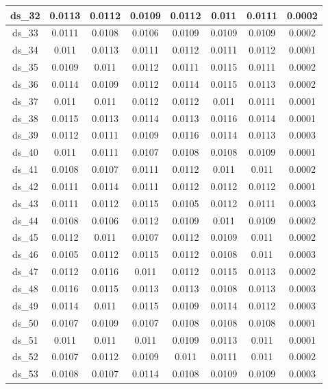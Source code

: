 \begin{longtable}{|c|c|c|c|c|c|c|c|}
ds\_32	& 0.0113	& 0.0112	& 0.0109	& 0.0112	& 0.011	& 0.0111	& 0.0002	\\ \hline
ds\_33	& 0.0111	& 0.0108	& 0.0106	& 0.0109	& 0.0109	& 0.0109	& 0.0002	\\ \hline
ds\_34	& 0.011	& 0.0113	& 0.0111	& 0.0112	& 0.0111	& 0.0112	& 0.0001	\\ \hline
ds\_35	& 0.0109	& 0.011	& 0.0112	& 0.0111	& 0.0115	& 0.0111	& 0.0002	\\ \hline
ds\_36	& 0.0114	& 0.0109	& 0.0112	& 0.0114	& 0.0115	& 0.0113	& 0.0002	\\ \hline
ds\_37	& 0.011	& 0.011	& 0.0112	& 0.0112	& 0.011	& 0.0111	& 0.0001	\\ \hline
ds\_38	& 0.0115	& 0.0113	& 0.0114	& 0.0113	& 0.0116	& 0.0114	& 0.0001	\\ \hline
ds\_39	& 0.0112	& 0.0111	& 0.0109	& 0.0116	& 0.0114	& 0.0113	& 0.0003	\\ \hline
ds\_40	& 0.011	& 0.0111	& 0.0107	& 0.0108	& 0.0108	& 0.0109	& 0.0001	\\ \hline
ds\_41	& 0.0108	& 0.0107	& 0.0111	& 0.0112	& 0.011	& 0.011	& 0.0002	\\ \hline
ds\_42	& 0.0111	& 0.0114	& 0.0111	& 0.0112	& 0.0112	& 0.0112	& 0.0001	\\ \hline
ds\_43	& 0.0111	& 0.0112	& 0.0115	& 0.0105	& 0.0112	& 0.0111	& 0.0003	\\ \hline
ds\_44	& 0.0108	& 0.0106	& 0.0112	& 0.0109	& 0.011	& 0.0109	& 0.0002	\\ \hline
ds\_45	& 0.0112	& 0.011	& 0.0107	& 0.0112	& 0.0109	& 0.011	& 0.0002	\\ \hline
ds\_46	& 0.0105	& 0.0112	& 0.0115	& 0.0112	& 0.0108	& 0.011	& 0.0003	\\ \hline
ds\_47	& 0.0112	& 0.0116	& 0.011	& 0.0112	& 0.0115	& 0.0113	& 0.0002	\\ \hline
ds\_48	& 0.0116	& 0.0115	& 0.0113	& 0.0113	& 0.0108	& 0.0113	& 0.0003	\\ \hline
ds\_49	& 0.0114	& 0.011	& 0.0115	& 0.0109	& 0.0114	& 0.0112	& 0.0003	\\ \hline
ds\_50	& 0.0107	& 0.0109	& 0.0107	& 0.0108	& 0.0108	& 0.0108	& 0.0001	\\ \hline
ds\_51	& 0.011	& 0.011	& 0.011	& 0.0109	& 0.0113	& 0.011	& 0.0001	\\ \hline
ds\_52	& 0.0107	& 0.0112	& 0.0109	& 0.011	& 0.0111	& 0.011	& 0.0002	\\ \hline
ds\_53	& 0.0108	& 0.0107	& 0.0114	& 0.0108	& 0.0109	& 0.0109	& 0.0003	\\ \hline

\end{longtable}
